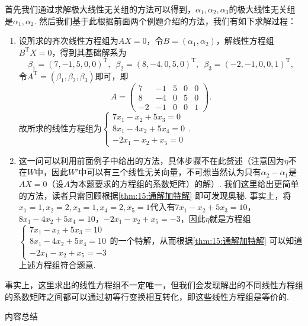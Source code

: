 \begin{solution}
    首先我们通过求解极大线性无关组的方法可以得到，$\alpha_1,\alpha_2,\alpha_3$的极大线性无关组是$\alpha_1,\alpha_2$. 然后我们基于此根据前面两个例题介绍的方法，我们有如下求解过程：
    \begin{enumerate}
        \item 设所求的齐次线性方程组为$AX=0$，令$B=(\alpha_1,\alpha_2)$，解线性方程组$B^\mathrm{T}X=0$，得到其基础解系为
              \[\beta_1=(7,-1,5,0,0)^\mathrm{T},\enspace\beta_2=(8,-4,0,5,0)^\mathrm{T},\enspace\beta_3=(-2,-1,0,0,1)^\mathrm{T},\]
              令$A^\mathrm{T}=(\beta_1,\beta_2,\beta_3)$即可，即
              \[A=\begin{pmatrix}
                      7 & -1 & 5 & 0 & 0 \\ 8 & -4 & 0 & 5 & 0 \\ -2 & -1 & 0 & 0 & 1
                  \end{pmatrix}.\]
              故所求的线性方程组为$\begin{cases}
                      7x_1-x_2+5x_3=0 \\ 8x_1-4x_2+5x_4=0 \\ -2x_1-x_2+x_5=0
                  \end{cases}$.

        \item 这一问可以利用前面例子中给出的方法，具体步骤不在此赘述（注意因为$\eta$不在$W$中，因此$W'$中可以有三个线性无关向量，不可想当然认为只有$\alpha_2-\alpha_1$是$AX=0$（设$A$为本题要求的方程组的系数矩阵）的解）. 我们这里给出更简单的方法，读者只需回顾根据\autoref{thm:15:通解加特解} 即可发现奥秘. 事实上，将$x_1=1,x_2=2,x_3=1,x_4=2,x_5=1$代入有$7x_1-x_2+5x_3=10$，$8x_1-4x_2+5x_4=10$，$-2x_1-x_2+x_5=-3$，因此$\eta$就是方程组$\begin{cases}
                      7x_1-x_2+5x_3=10 \\ 8x_1-4x_2+5x_4=10 \\ -2x_1-x_2+x_5=-3
                  \end{cases}$的一个特解，从而根据\autoref{thm:15:通解加特解} 可以知道上述方程组符合题意.
    \end{enumerate}
\end{solution}

事实上，这里求出的线性方程组不一定唯一，但我们会发现解出的不同线性方程组的系数矩阵之间都可以通过初等行变换相互转化，即这些线性方程组是等价的.

\vspace{2ex}
\centerline{\heiti \Large 内容总结}

